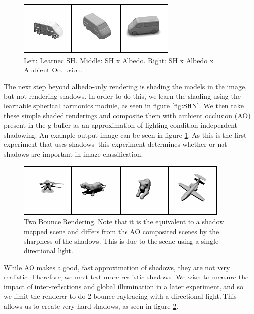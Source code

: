 \documentclass[10pt,twocolumn,letterpaper]{article}
\begin{document}
\begin{figure}[h!]
\centering
\includegraphics[width=1.0\columnwidth]{./assets/sh-comp-onerow.png}
\caption{Left: Learned SH. Middle: SH x Albedo. Right: SH x Albedo x Ambient Occlusion.}
\label{fig:SHComparison}
\end{figure}
The next step beyond albedo-only rendering is shading the models in the image, but not rendering shadows. In order to do this, we learn the shading using the learnable spherical harmonics module, as seen in figure \ref{fig:SHN}.  We then take these simple shaded renderings and composite them with ambient occlusion (AO) present in the g-buffer as an approximation of lighting condition independent shadowing. An example output image can be seen in figure \ref{fig:SHComparison}. As this is the first experiment that uses shadows, this experiment determines whether or not shadows are important in image classification.

\begin{figure}[h!]
\centering
\includegraphics[width=1.0\columnwidth]{./assets/2bounce_small.png}
\caption{Two Bounce Rendering.  Note that it is the equivalent to a shadow mapped scene and differs from the AO composited scenes by the sharpness of the shadows. This is due to the scene using a single directional light.}
\label{fig:2BOUNCE}
\end{figure}
While AO makes a good, fast approximation of shadows, they are not very realistic. Therefore, we next test more realistic shadows. We wish to measure the impact of inter-reflections and global illumination in a later experiment, and so we limit the renderer to do 2-bounce raytracing with a directional light. This allows us to create very hard shadows, as seen in figure \ref{fig:2BOUNCE}.
\end{document}
